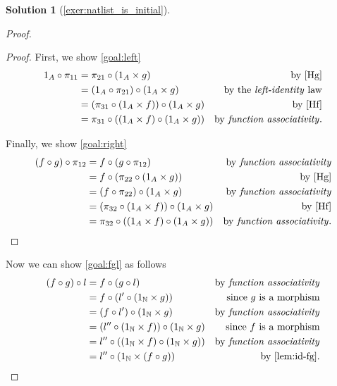 \documentclass[a4paper,11pt, oneside,titlepage=false]{scrbook}
\theoremstyle{plain}
\theoremstyle{definition}
\newtheorem{solution}[thm]{Solution}
\newcommand{\NN}{\ensuremath{\mathbb{N}}}
\begin{document}
\begin{solution}[\cref{exer:natlist_is_initial}]
\begin{proof}
\begin{proof}
				First, we show \eqref{goal:left}
				\begin{align*}
					1_A \circ \pi_{11} & = \pi_{21} \circ (1_A \times g)                          & \text{by \eqref{Hg}}                      \\
					                   & = ( 1_A \circ \pi_{21} ) \circ (1_A \times g)            & \text{by the \textit{left-identity} law}  \\
					                   & = ( \pi_{31} \circ (1_A \times f) ) \circ (1_A \times g) & \text{by \eqref{Hf}}                      \\
					                   & = \pi_{31} \circ ((1_A \times f) \circ (1_A \times g))   & \text{by \textit{function associativity}}
					.
				\end{align*}

				Finally, we show \eqref{goal:right}
				\begin{align*}
					(f \circ g) \circ \pi_{12} & = f \circ (g \circ \pi_{12})                           & \text{by \textit{function associativity}}  \\
					                           & = f \circ (\pi_{22} \circ (1_A \times g))              & \text{by \eqref{Hg}}                       \\
					                           & = (f \circ \pi_{22}) \circ (1_A \times g)              & \text{by \textit{function associativity}}  \\
					                           & = (\pi_{32} \circ (1_A \times f)) \circ (1_A \times g) & \text{by \eqref{Hf}}                       \\
					                           & = \pi_{32} \circ ((1_A \times f) \circ (1_A \times g)) & \text{by \textit{function associativity}}.
				\end{align*}
			\end{proof}

			Now we can show \eqref{goal:fgl} as follows
			\begin{align*}
				(f \circ g) \circ l & = f \circ (g \circ l)                                               & \text{by \textit{function associativity}} \\
				                    & = f \circ (l' \circ (1_\NN \times g))                        & \text{since $g$ is a morphism}            \\
				                    & = (f \circ l') \circ (1_\NN \times g)                        & \text{by \textit{function associativity}} \\
				                    & = (l'' \circ (1_\NN \times f)) \circ (1_\NN \times g) & \text{since $f$ is a morphism}            \\
				                    & = l'' \circ ((1_\NN \times f) \circ (1_\NN \times g)) & \text{by \textit{function associativity}} \\
				                    & = l'' \circ (1_\NN \times (f \circ g))                       & \text{by \cref{lem:id-fg}}.
			\end{align*}
		\end{proof}


\end{solution}
\end{document}
